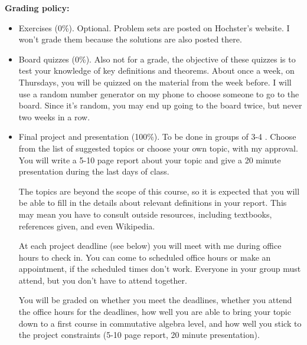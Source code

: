 \documentclass[12pt]%
{article}
\begin{document}
\newpage
\noindent\textbf{Grading policy:} 
\begin{itemize}
\item Exercises (0\%).  Optional.  Problem sets are posted on Hochster's website. I won't grade them because the solutions are also posted there. %
\item Board quizzes (0\%).  Also not for a grade, the objective of these quizzes is to test your knowledge of key definitions and theorems.  %
About once a week, on Thursdays,  %
you will be quizzed on the material from the week before.  I will use a random number generator on my phone to choose someone to go to the board. Since it's random, you may end up going to the board twice, but never two weeks in a row.
\item Final project and presentation (100\%).  To be done in groups of 3-4%
.  Choose from the list of suggested topics or choose your own topic, with my approval.  You will write a 5-10 page report about your topic and give a 20 minute presentation during the last days of class.  %

The topics are beyond the scope of this course, so it is expected that you will be able to fill in the details about relevant definitions in your report.  This may mean you have to consult outside resources, including textbooks, references given, and even Wikipedia.  %

At each project deadline (see below) you will meet with me during office hours to check in.  You can come to scheduled office hours or make an appointment, if the scheduled times don't work.  Everyone in your group must attend, but you don't have to attend together. 

You will be graded on whether you meet the deadlines, whether you attend the office hours for the deadlines, how well you are able to bring your topic down to a first course in commutative algebra level, and how well you stick to the project constraints (5-10 page report, 20 minute presentation).
\end{itemize}
\end{document}
